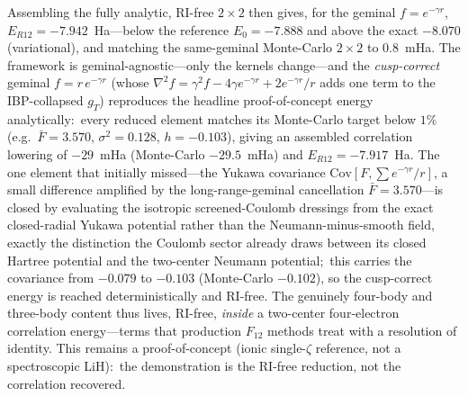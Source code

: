 \documentclass[aps,pra,twocolumn,superscriptaddress,longbibliography]{revtex4-2}
\begin{document}
Assembling the fully analytic, RI-free $2\times2$ then gives, for the geminal
$f=e^{-\gamma r}$, $E_{R12}=-7.942$~Ha---below the reference $E_0=-7.888$ and
above the exact $-8.070$ (variational), and matching the same-geminal
Monte-Carlo $2\times2$ to $0.8$~mHa.  The framework is geminal-agnostic---only
the kernels change---and the \emph{cusp-correct} geminal $f=r\,e^{-\gamma r}$
(whose $\nabla^2 f=\gamma^2 f-4\gamma e^{-\gamma r}+2e^{-\gamma r}/r$ adds one
term to the IBP-collapsed $g_T$) reproduces the headline proof-of-concept energy
analytically:\ every reduced element matches its Monte-Carlo target below $1\%$
(e.g.\ $\bar F=3.570$, $\sigma^2=0.128$, $h=-0.103$), giving an assembled
correlation lowering of $-29$~mHa (Monte-Carlo $-29.5$~mHa) and
$E_{R12}=-7.917$~Ha.  The one element that initially missed---the Yukawa
covariance $\mathrm{Cov}[F,\sum e^{-\gamma r}/r]$, a small difference amplified
by the long-range-geminal cancellation $\bar F=3.570$---is closed by evaluating
the isotropic screened-Coulomb dressings from the exact closed-radial Yukawa
potential rather than the Neumann-minus-smooth field, exactly the distinction
the Coulomb sector already draws between its closed Hartree potential and the
two-center Neumann potential;\ this carries the covariance from $-0.079$ to
$-0.103$ (Monte-Carlo $-0.102$), so the cusp-correct energy is reached
deterministically and RI-free.  The genuinely
four-body and three-body content thus lives, RI-free, \emph{inside} a
two-center four-electron correlation energy---terms that production $F_{12}$
methods treat with a resolution of identity.  This remains a
proof-of-concept (ionic single-$\zeta$ reference, not a spectroscopic LiH):\
the demonstration is the RI-free reduction, not the correlation recovered.
\end{document}
